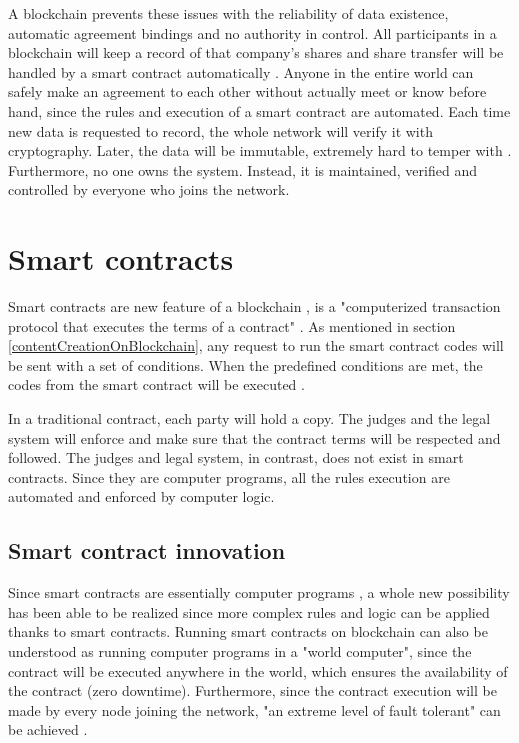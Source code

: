 \documentclass[twoside,numperchapter]{tutthesis} %
\begin{document}
A blockchain prevents these issues with the reliability of data existence, automatic agreement bindings and no authority in control. All participants in a blockchain will keep a record of that company's shares and share transfer will be handled by a smart contract automatically \citep{RefWorks:doc:BlockchainProtocolInClinicalTrials}. Anyone in the entire world can safely make an agreement to each other without actually meet or know before hand, since the rules and execution of a smart contract are automated.  Each time new data is requested to record, the whole network will verify it with cryptography. Later, the data will be immutable, extremely hard to temper with \citep{RefWorks:doc:BitcoinWhitepaper}\citep{RefWorks:doc:EthereumWhitepaper}. Furthermore, no one owns the system. Instead, it is maintained, verified and controlled by everyone who joins the network.

\section{Smart contracts}

Smart contracts are new feature of a blockchain \citep{RefWorks:doc:BlockchainInSustainableEnergySystem}, is a "computerized transaction protocol that executes the terms of a
contract" \citep{SmartContracts}. As mentioned in section \ref{contentCreationOnBlockchain}, any request to run the smart contract codes will be sent with a set of conditions. When the predefined conditions are met, the codes from the smart contract will be executed \citep{RefWorks:doc:MasteringBlockchain}.

In a traditional contract, each party will hold a copy. The judges and the legal system will enforce and make sure that the contract terms will be respected and followed. The judges and legal system, in contrast, does not exist in smart contracts. Since they are computer programs, all the rules execution are automated and enforced by computer logic.

\subsection{Smart contract innovation}

Since smart contracts are essentially computer programs \citep{Ethdocorg:EVM}, a whole new possibility has been able to be realized since more complex rules and logic can be applied thanks to smart contracts. Running smart contracts on blockchain can also be understood as running computer programs in a "world computer", since the contract will be executed anywhere in the world, which ensures the availability of the contract (zero downtime). Furthermore, since the contract execution will be made by every node joining the network, "an extreme level of fault tolerant" can be achieved \citep{Ethdocorg:EVM}.
\end{document}

